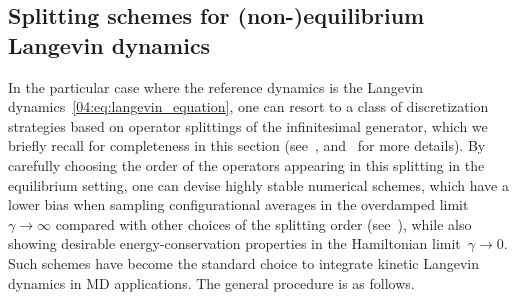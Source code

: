 \subsection{Splitting schemes for (non-)equilibrium Langevin dynamics}\label{04:subsec:discr_nemd}
In the particular case where the reference dynamics is the Langevin dynamics~\eqref{04:eq:langevin_equation}, one can resort to a class of discretization strategies based on operator splittings of the infinitesimal generator, which we briefly recall for completeness in this section (see~\cite{LM13a,LMS16},  and~\cite[Chapter 7]{LM15} for more details).
By carefully choosing the order of the operators appearing in this splitting in the equilibrium setting, one can devise highly stable numerical schemes, which have a lower bias when sampling configurational averages in the overdamped limit~$\gamma\to\infty$ compared with other choices of the splitting order (see~\cite{LM13a}), while also showing desirable energy-conservation properties in the Hamiltonian limit~$\gamma\to 0$. Such schemes have become the standard choice to integrate kinetic Langevin dynamics in MD applications. The general procedure is as follows.

